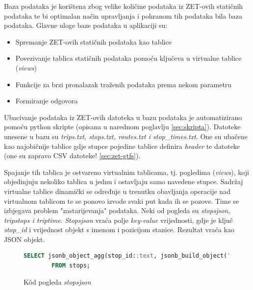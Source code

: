 \documentclass[zavrsnirad]{fer}
\begin{document}
Baza podataka je korištena zbog velike količine podataka iz ZET-ovih statičnih podataka te bi optimalan način upravljanja i pohranom tih podataka bila baza podataka.
Glavne uloge baze podataka u aplikaciji su:
\begin{itemize}
	\item Spremanje ZET-ovih statičnih podataka kao tablice
 	\item Povezivanje tablica statičnih podataka pomoću ključeva u virtualne tablice (\textit{views})
 	\item Funkcije za brzi pronalazak traženih podataka prema nekom parametru
 	\item Formiranje odgovora
\end{itemize}

Ubacivanje podataka iz ZET-ovih datoteka u bazu podataka je automatizirano pomoću python skripte (opisana u narednom poglavlju \ref{sec:skripta}). Datoteke unesene u bazu su \textit{trips.txt, stops.txt, routes.txt i stop\_times.txt}. One su ubačene kao najobičnije tablice gdje stupce pojedine tablice definira \textit{header} te datoteke (one su zapravo CSV datoteke! \ref{sec:zet-gtfs}).

Spajanje tih tablica je ostvareno virtualnim tablicama, tj. pogledima (\textit{views}), koji objedinjuju nekoliko tablica u jednu i ostavljaju samo navedene stupce. Sadržaj virtualne tablice dinamički se određuje u trenutku obavljanja operacije nad virtualnom tablicom te se ponovo izvode svaki put kada ih se pozove. Time se izbjegava problem "zastarijevanja" podataka.
\newpage
Neki od pogleda su \textit{stopsjson, tripstops i triptime}.
\textit{Stopsjson} vraća polje \textit{key-value} vrijednosti, gdje je ključ \textit{stop\_id} i vrijednost objekt s imenom i pozicijom stanice. Rezultat vraća kao JSON objekt.
\begin{figure}[h]
	\centering
	\begin{minipage}{0.8\linewidth}
		\begin{lstlisting}[language=SQL]
 		SELECT jsonb_object_agg(stop_id::text, jsonb_build_object('stop_name', stop_name, 'stop_lat', stop_lat, 'stop_lon', stop_lon)) AS stops
		FROM stops;
		\end{lstlisting}
	\end{minipage}
	\caption{K\^od pogleda \textit{stopsjson}}
	\label{slk:stopsjson}
\end{figure}
\\
\end{document}
